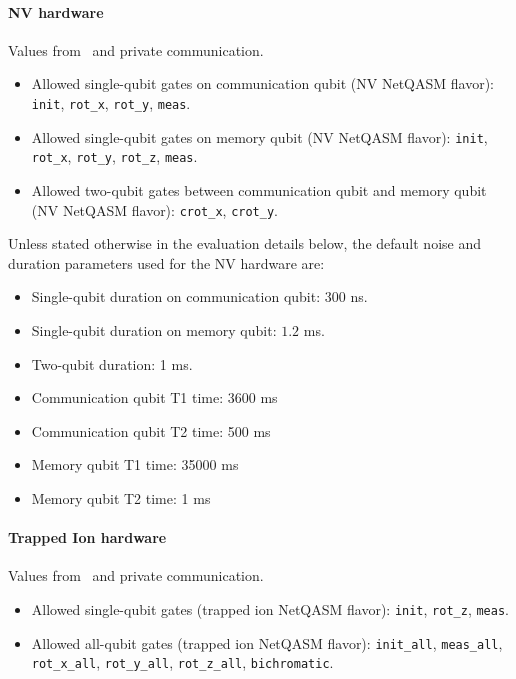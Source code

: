 \paragraph{NV hardware}
Values from~\cite{avis2023requirements} and private communication.

\begin{itemize}
  \item Allowed single-qubit gates on communication qubit (NV NetQASM flavor): \texttt{init}, \texttt{rot\_x}, \texttt{rot\_y}, \texttt{meas}.
  \item Allowed single-qubit gates on memory qubit (NV NetQASM flavor): \texttt{init}, \texttt{rot\_x}, \texttt{rot\_y}, \texttt{rot\_z}, \texttt{meas}.
  \item Allowed two-qubit gates between communication qubit and memory qubit (NV NetQASM flavor): \texttt{crot\_x}, \texttt{crot\_y}.
\end{itemize}

Unless stated otherwise in the evaluation details below, the default noise and duration parameters used for the NV hardware are:
\begin{itemize}
  \item Single-qubit duration on communication qubit: 300 ns.
  \item Single-qubit duration on memory qubit: $1.2$ ms.
  \item Two-qubit duration: 1 ms.
  \item Communication qubit T1 time: 3600 ms
  \item Communication qubit T2 time: 500 ms
  \item Memory qubit T1 time: 35000 ms
  \item Memory qubit T2 time: 1 ms
\end{itemize}

\paragraph{Trapped Ion hardware}
Values from~\cite{avis2023requirements} and private communication.

\begin{itemize}
  \item Allowed single-qubit gates (trapped ion NetQASM flavor): \texttt{init}, \texttt{rot\_z}, \texttt{meas}.
  \item Allowed all-qubit gates (trapped ion NetQASM flavor): \texttt{init\_all}, \texttt{meas\_all}, \texttt{rot\_x\_all}, \texttt{rot\_y\_all}, \texttt{rot\_z\_all}, \texttt{bichromatic}.
\end{itemize}


